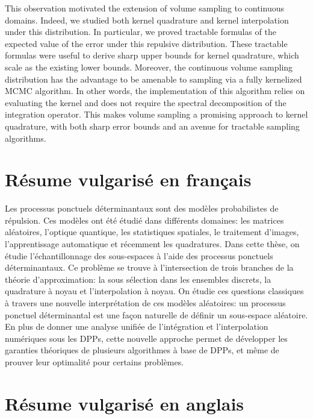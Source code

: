 \documentclass[twoside,11pt]{book}
\numberwithin{theorem}{chapter}
\numberwithin{definition}{chapter}
\numberwithin{proposition}{chapter}
\numberwithin{corollary}{chapter}
\numberwithin{example}{chapter}
\numberwithin{lemma}{chapter}
\numberwithin{assumption}{chapter}
\numberwithin{equation}{chapter}
\numberwithin{figure}{chapter}
\begin{document}
This observation motivated the extension of volume sampling to continuous domains. Indeed, we studied both kernel quadrature and kernel interpolation under this distribution. In particular, we proved tractable formulas of the expected value of the error under this repulsive distribution. These tractable formulas were useful to derive sharp upper bounds for kernel quadrature, which scale as the existing lower bounds. Moreover, the continuous volume sampling distribution has the advantage to be amenable to sampling via a fully kernelized MCMC algorithm. In other words, the implementation of this algorithm 
relies on evaluating the kernel and
does not require the spectral decomposition of the integration operator. This makes volume sampling a promising approach to kernel quadrature, with both sharp error bounds and an avenue for tractable sampling algorithms.


\section{Résume vulgarisé en français}

Les processus ponctuels déterminantaux sont des modèles probabilistes de répulsion. Ces modèles ont été étudié dans différents domaines: les matrices aléatoires, l’optique quantique, les statistiques spatiales, le traitement d’images, l’apprentissage automatique et récemment les quadratures.
Dans cette thèse, on étudie l’échantillonnage des sous-espaces à l’aide des processus ponctuels déterminantaux. Ce problème se trouve à l’intersection de trois branches de la théorie d’approximation: la sous sélection dans les ensembles discrets, la quadrature à noyau et l’interpolation à noyau. On étudie ces questions classiques à travers une nouvelle interprétation de ces modèles aléatoires: un processus ponctuel déterminantal est une façon naturelle de définir un sous-espace aléatoire. En plus de donner une analyse unifiée de l’intégration et l’interpolation numériques sous les DPPs, cette nouvelle approche permet de développer les garanties théoriques de plusieurs algorithmes à base de DPPs, et même de prouver leur optimalité pour certains problèmes.

\section{Résume vulgarisé en anglais}
\end{document}
